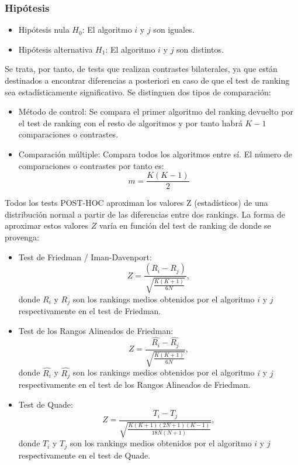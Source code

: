 \subsubsection{Hipótesis}
\begin{itemize}
\item Hipótesis nula $H_0$: El algoritmo $i$ y $j$ son iguales.
\item Hipótesis alternativa $H_1$: El algoritmo $i$ y $j$ son distintos.
\end{itemize}
Se trata, por tanto, de tests que realizan contrastes bilaterales, ya que están destinados a encontrar diferencias
a posteriori en caso de que el test de ranking sea estadísticamente significativo. Se distinguen dos tipos de
comparación:

\begin{itemize}
\item Método de control: Se compara el primer algoritmo del ranking devuelto por el test de ranking con el resto
de algoritmos y por tanto habrá $K-1$ comparaciones o contrastes.
\item Comparación múltiple: Compara todos los algoritmos entre sí. El número de comparaciones o contrastes por
tanto es:
\[ m = \frac{K(K-1)}{2} \]
\end{itemize}

Todos los tests POST-HOC aproximan los valores Z (estadísticos) de una distribución normal a partir de las
diferencias entre dos rankings. La forma de aproximar estos valores $Z$ varía en función del test de ranking de
donde se provenga:

\begin{itemize}
\item Test de Friedman / Iman-Davenport:
\[ Z = \frac{(R_i - R_j)}{\sqrt{\frac{K(K+1)}{6N}}}, \]
donde $R_i$ y $R_j$ son los rankings medios obtenidos por el algoritmo $i$ y $j$ respectivamente en el test
de Friedman.
\item Test de los Rangos Alineados de Friedman:
\[ Z = \frac{\hat{R_{i}} - \hat{R_{j}}}{\sqrt{\frac{K(K+1)}{6N}}}, \]
donde $\hat{R_{i}}$ y $\hat{R_{j}}$ son los rankings medios obtenidos por el algoritmo $i$ y $j$ respectivamente en el test
de los Rangos Alineados de Friedman.
\item Test de Quade:
\[ Z = \frac {T_i - T_j}{\sqrt{\frac{K(K+1)(2N+1)(K-1)}{18N(N+1)}}}, \]
donde $T_i$ y $T_j$ son los rankings medios obtenidos por el algoritmo $i$ y $j$ respectivamente en el test
de Quade.
\end{itemize}


